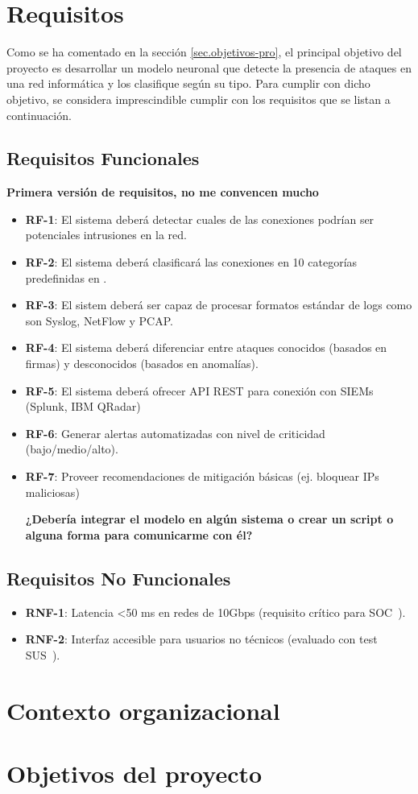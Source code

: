 \section{Requisitos}  \label{sec.requisitos} 
Como se ha comentado en la sección \ref{sec.objetivos-pro}, 
el principal objetivo del proyecto es desarrollar un modelo neuronal que detecte la presencia de ataques en una red informática y los clasifique según su tipo. Para cumplir con dicho objetivo, se considera imprescindible cumplir con los requisitos que se listan a continuación.

\subsection{Requisitos Funcionales}   \label{sec.req-funcionales}
\textbf{Primera versión de requisitos, no me convencen mucho}
\begin{itemize}  
    \item \textbf{RF-1}: El sistema deberá detectar cuales de las conexiones podrían ser potenciales intrusiones en la red.
    \item \textbf{RF-2}: El sistema deberá clasificará las conexiones en 10 categorías predefinidas en .  
	\item \textbf{RF-3}: El sistem deberá ser capaz de procesar formatos estándar de logs como son Syslog, NetFlow y PCAP.
	\item \textbf{RF-4}: El sistema deberá diferenciar entre ataques conocidos (basados en firmas) y desconocidos (basados en anomalías).
	\item \textbf{RF-5}: El sistema deberá ofrecer API REST para conexión con SIEMs (Splunk, IBM QRadar)
	\item \textbf{RF-6}: Generar alertas automatizadas con nivel de criticidad (bajo/medio/alto).
	\item \textbf{RF-7}: Proveer recomendaciones de mitigación básicas (ej. bloquear IPs maliciosas)

	
	
\textbf{¿Debería integrar el modelo en algún sistema o crear un script o alguna forma para comunicarme con él?}
		
\end{itemize}  

\subsection{Requisitos No Funcionales}   \label{sec.req-no-funcionales}
\begin{itemize}  
    \item \textbf{RNF-1}: Latencia <50 ms en redes de 10Gbps (requisito crítico para SOC~\cite{nist2021ai}).  
    \item \textbf{RNF-2}: Interfaz accesible para usuarios no técnicos (evaluado con test SUS~\cite{brooke1996sus}).  
\end{itemize}  


\section{Contexto organizacional} \label{sec.contexto-organizacional}


\section{Objetivos del proyecto}